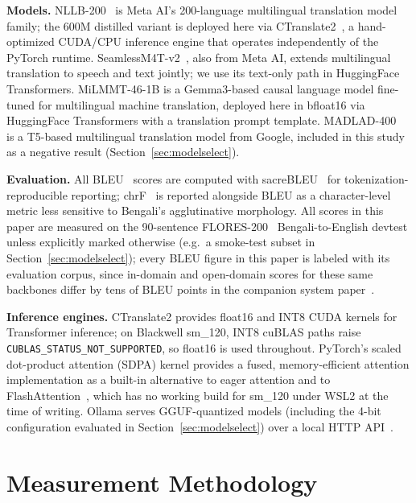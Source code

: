 \documentclass[conference]{IEEEtran}
\begin{document}
\textbf{Models.} NLLB-200~\cite{nllb2022} is Meta AI's 200-language
multilingual translation model family; the 600M distilled variant is
deployed here via CTranslate2~\cite{ctranslate2_klein}, a hand-optimized
CUDA/CPU inference engine that operates independently of the PyTorch
runtime. SeamlessM4T-v2~\cite{seamlessm4t2023}, also from Meta AI, extends
multilingual translation to speech and text jointly; we use its text-only
path in HuggingFace Transformers. MiLMMT-46-1B is a Gemma3-based causal
language model fine-tuned for multilingual machine translation, deployed
here in bfloat16 via HuggingFace Transformers with a translation prompt
template. MADLAD-400~\cite{kudugunta2023madlad} is a T5-based multilingual
translation model from Google, included in this study as a negative
result (Section~\ref{sec:modelselect}).

\textbf{Evaluation.} All BLEU~\cite{papineni2002bleu} scores are computed
with sacreBLEU~\cite{post2018call} for tokenization-reproducible reporting;
chrF~\cite{popovic2015chrf} is reported alongside BLEU as a
character-level metric less sensitive to Bengali's agglutinative
morphology. All scores in this paper are measured on the 90-sentence
FLORES-200~\cite{nllb2022} Bengali-to-English devtest unless explicitly
marked otherwise (e.g.\ a smoke-test subset in
Section~\ref{sec:modelselect}); every BLEU figure in this paper is labeled
with its evaluation corpus, since in-domain and open-domain scores for
these same backbones differ by tens of BLEU points in the companion
system paper~\cite{biswas2025bnentr}.

\textbf{Inference engines.} CTranslate2 provides float16 and INT8 CUDA
kernels for Transformer inference; on Blackwell sm\_120, INT8 cuBLAS paths
raise \texttt{CUBLAS\_STATUS\_NOT\_SUPPORTED}, so float16 is used
throughout. PyTorch's scaled dot-product attention (SDPA) kernel
provides a fused, memory-efficient attention implementation as a
built-in alternative to eager attention and to
FlashAttention~\cite{dao2022flashattention}, which has no working build
for sm\_120 under WSL2 at the time of writing. Ollama serves GGUF-quantized
models (including the 4-bit configuration evaluated in
Section~\ref{sec:modelselect}) over a local HTTP API~\cite{ollama2024}.

\section{Measurement Methodology}
\label{sec:methodology}
\end{document}
